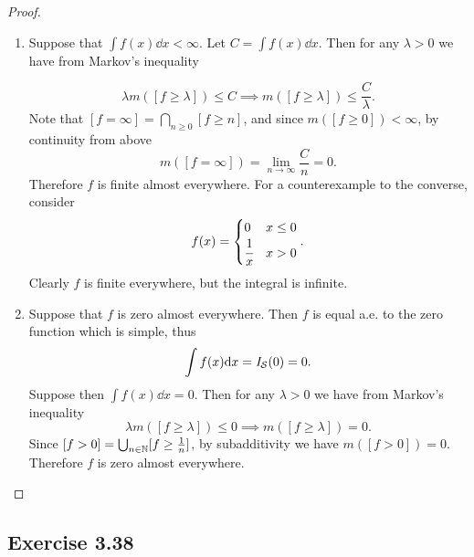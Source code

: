 \documentclass[hw_all.tex]{subfiles}
\begin{document}
\begin{proof}
    \begin{enumerate}
        \item
            Suppose that $\int f(x) \dd x < \infty$. Let $C = \int f(x) \dd x$. Then for any $\lambda > 0$ we have from Markov's inequality

            \[
                \lambda m([f \geq \lambda]) \leq C \implies m([f \geq \lambda]) \leq \frac{C}{\lambda}
            .\]
            Note that $[f = \infty] = \bigcap_{n \geq 0} [f \geq n]$, and since $m([f \geq 0]) < \infty$, by continuity from above
            \[
                m([f = \infty]) = \lim_{n \to \infty} \frac{C}{n} = 0
            .\]
            Therefore $f$ is finite almost everywhere. For a counterexample to the converse, consider
            \[
                f(x) = \begin{cases}
                    0 & x \leq 0 \\
                    \cfrac{1}{x} & x > 0
                \end{cases}
            .\]
            Clearly $f$ is finite everywhere, but the integral is infinite.
        \item 
            Suppose that $f$ is zero almost everywhere. Then $f$ is equal a.e. to the zero function which is simple, thus
            \[
                \int f(x) \dd x = \mathit{I}_{\mathcal{S}}(0) = 0
            .\]
            Suppose then $\int f(x) \dd x = 0$. Then for any $\lambda > 0$ we have from Markov's inequality
            \[
                \lambda m([f \geq \lambda]) \leq 0 \implies m([f \geq \lambda]) = 0
            .\]
            Since $[f > 0] = \bigcup_{n \in \mathbb{N}} [f \geq \frac{1}{n}]$, by subadditivity we have $m([f > 0]) = 0$. Therefore $f$ is zero almost everywhere.
    \end{enumerate}
\end{proof}

\subsection{Exercise 3.38}
\end{document}
